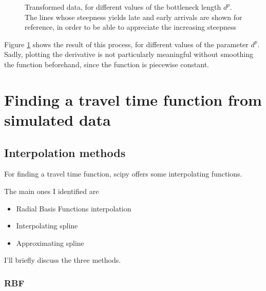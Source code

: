 \documentclass{article}
\begin{document}
\begin{figure}
  \centering
  \caption{Transformed data, for different values of the bottleneck length $d^p$. The lines whose steepness yields late and early arrivals are shown for reference, in order to be able to appreciate the increasing steepness}
  \label{fig:modifying_data}
\end{figure}

Figure \ref{fig:modifying_data} shows the result of this process, for different values of the parameter \(d^p\).
Sadly, plotting the derivative is not particularly meaningful without smoothing the function beforehand,
since the function is piecewise constant.

\section{Finding a travel time function from simulated data}

\subsection{Interpolation methods}

For finding a travel time function, scipy offers some interpolating functions.

The main ones I identified are
\begin{itemize}
\item Radial Basis Functions interpolation
\item Interpolating spline
\item Approximating spline
\end{itemize}

I'll briefly discuss the three methods.


\subsubsection{RBF}
\end{document}
